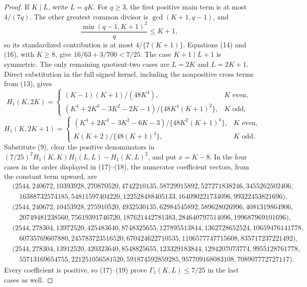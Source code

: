 \documentclass{article}
\begin{document}
\begin{proof}
If \(K\mid L\), write \(L=qK\).  For \(q\geq3\), the first positive main term is at most \(4/(7q)\).  The other greatest common divisor is \(\gcd(K+1,q-1)\), and
\[
 \frac{\min(q-1,K+1)^2}{q}\leq K+1,                                            \tag{16}
\]
so its standardized contribution is at most \(4/\{7(K+1)\}\).  Equations (14) and (16), with \(K\geq8\), give \(16/63+3/700<7/25\).  The case \(K+1\mid L+1\) is symmetric.  The only remaining quotient-two cases are \(L=2K\) and \(L=2K+1\).  Direct substitution in the full signed kernel, including the nonpositive cross terms from (13), gives
\[
 H_1(K,2K)=
 \begin{cases}
 (K-1)(K+1)/(48K^4),&K\text{ even},\\
 (K^4+2K^3-3K^2-2K-1)/\{48K^4(K+1)^2\},&K\text{ odd},
 \end{cases}                                                                    \tag{17}
\]
\[
 H_1(K,2K+1)=
 \begin{cases}
 (K^4+2K^3-3K^2-6K-3)/\{48K^2(K+1)^4\},&K\text{ even},\\
 K(K+2)/\{48(K+1)^4\},&K\text{ odd}.
 \end{cases}                                                                    \tag{18}
\]
Substitute (9), clear the positive denominators in
\((7/25)^2H_1(K,K)H_1(L,L)-H_1(K,L)^2\), and put \(x=K-8\).  In the four cases in the order displayed in (17)--(18), the numerator coefficient vectors, from the constant term upward, are
\[
\begin{split}
 &(2544,240672,10393928,270870520,4742210135,58729915892,527271838246,3455262502406,\\
 &\quad16388732574185,54811597404220,122528488405133,164090221734096,99322453821696),\\
 &(2544,240672,10453928,275910520,4932530135,62984545892,589628026996,4081319864906,\\
 &\quad20749481238560,75619391746720,187621442781383,284640797514096,199687969101696),\\
 &(2544,278304,13972520,425483640,8748325655,127895513844,1362728652524,10659476141778,\\
 &\quad60735769607880,245783723516520,670424622710535,1106577747715608,835717237221492),\\
 &(2544,278304,13912520,420323640,8548825655,123329183844,1294207073774,9955128761778,\\
 &\quad55713169654755,221251056581520,591874592859285,957709168083108,708907772727117).
\end{split}                                                                      \tag{19}
\]
Every coefficient is positive, so (17)--(19) prove \(\Gamma_1(K,L)\leq7/25\) in the last cases as well.


\end{proof}
\end{document}
